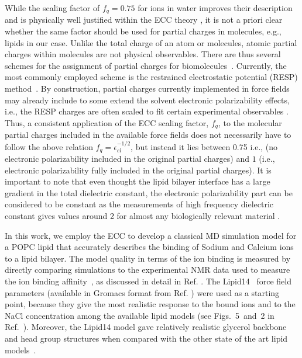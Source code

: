 \documentclass[aip,jcp,twocolumn]{revtex4}
\begin{document}
While the scaling factor of $f_q = 0.75$ for ions in water improves their description and is physically well justified within the ECC theory \cite{Leontyev2011},
it is not a priori  clear whether the same factor should be used for partial charges in molecules,
e.g., lipids in our case. Unlike the total charge of an atom or molecules, atomic partial charges within molecules are not physical observables.
There are thus several schemes for the assignment of partial charges for biomolecules~\cite{Hu2007}.
Currently, the most commonly employed scheme is the restrained electrostatic potential (RESP) method~\cite{RESP_paper,Singh1984}.
By construction, partial charges currently implemented in force fields may already 
include  to some extend the solvent electronic polarizability effects, i.e.,
the RESP charges are often scaled to fit certain experimental observables . 
Thus, a consistent application of the ECC scaling factor, $f_q$, to the molecular partial charges
included in the available force fields does not necessarily have to follow the above relation $f_q = \epsilon _{el} ^{-1/2}$, 
but instead it lies between 0.75 i.e., (no electronic polarizability included in the original partial charges)
and $1$ (i.e., electronic polarizability fully included in the original partial charges).
It is important to note that even thought the lipid bilayer interface has a large gradient in
the total dielectric constant, the electronic polarizability part can be considered to be constant
as the measurements of high frequency dielectric constant gives values around 2 
for almost any biologically relevant material \cite{some_original_work, leontyev11}.


In this work, we employ the ECC to develop a classical MD simulation model for
a POPC lipid that accurately describes the binding of Sodium and Calcium ions to a lipid bilayer.
The model quality in terms of the ion binding is measured by directly
comparing simulations to the experimental NMR data used to measure the ion binding
affinity~\cite{akutsu81,altenbach84,scherer89}, as discussed in detail in Ref. .
The Lipid14~\cite{dickson14} force field parameters (available in Gromacs format from Ref. )
were used as a starting point, because they give the most
realistic response to the bound ions and to the NaCl concentration 
among the available lipid models (see Figs.~5~and~2 in Ref.~).
Moreover, the Lipid14 model gave relatively realistic glycerol backbone and
head group structures when compared with the other state of the art lipid models~\cite{botan15}.
\end{document}
